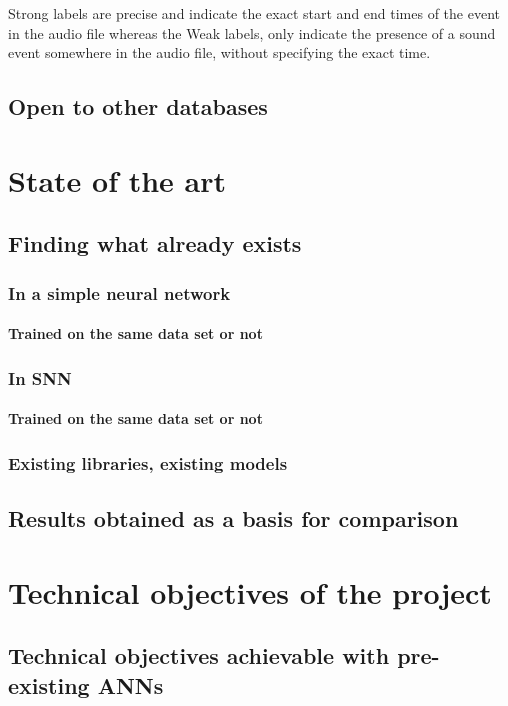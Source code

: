 \documentclass[11pt]{article}
\begin{document}
Strong labels are precise and indicate the exact start and end times of the event in the audio file whereas the Weak labels, only indicate the presence of a sound event somewhere in the audio file, without specifying the exact time. 

\subsection{Open to other databases}

\section{State of the art}
\subsection{Finding what already exists}
\subsubsection{In a simple neural network}
\paragraph{Trained on the same data set or not}
\subsubsection{In SNN}
\paragraph{Trained on the same data set or not}
\subsubsection{Existing libraries, existing models}
\subsection{Results obtained as a basis for comparison}

\section{Technical objectives of the project}
\subsection{Technical objectives achievable with pre-existing ANNs}
\end{document}

